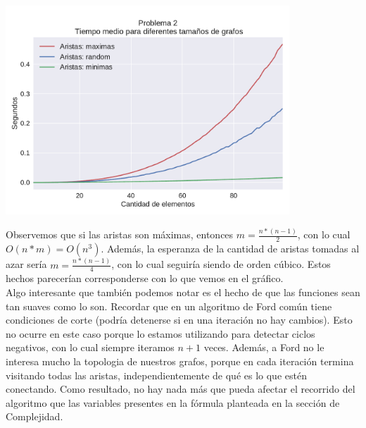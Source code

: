 {\centering
  \includegraphics[width=0.8\textwidth]{imagenes/problema2/n_aristas.pdf} \\
}

Observemos que si las aristas son máximas, entonces $m = \frac{n*(n-1)}{2}$, con lo cual $O(n*m) = O(n^3)$. Además, la esperanza de la cantidad de aristas tomadas al azar sería $m = \frac{n*(n-1)}{4}$, con lo cual seguiría siendo de orden cúbico. Estos hechos parecerían corresponderse con lo que vemos en el gráfico. \\

Algo interesante que también podemos notar es el hecho de que las funciones sean tan suaves como lo son. Recordar que en un algoritmo de Ford común tiene condiciones de corte (podría detenerse si en una iteración no hay cambios). Esto no ocurre en este caso porque lo estamos utilizando para detectar ciclos negativos, con lo cual siempre iteramos $n+1$ veces. Además, a Ford no le interesa mucho la topologia de nuestros grafos, porque en cada iteración termina visitando todas las aristas, independientemente  de qué es lo que estén conectando. Como resultado, no hay nada más que pueda afectar el recorrido del algoritmo que las variables presentes en la fórmula planteada en la sección de Complejidad.